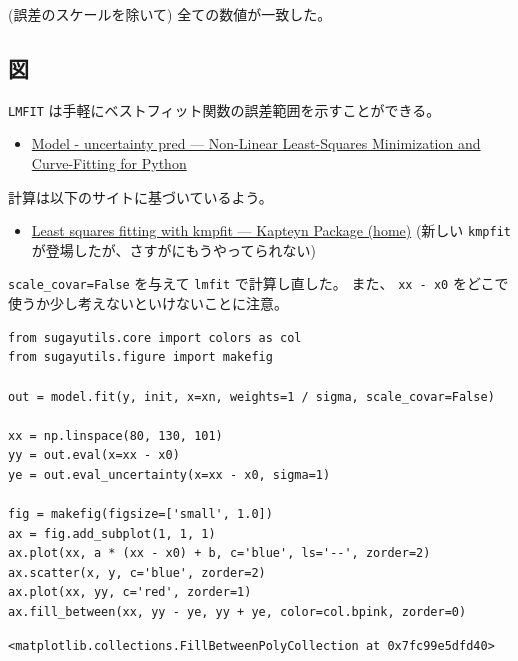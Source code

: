 \documentclass[a4paper, 8pt, notitlepage, uplatex, dvipdfmx]{jsarticle}
\begin{document}
(誤差のスケールを除いて) 全ての数値が一致した。
\subsection{図}
\label{sec:org5e487a8}
\texttt{LMFIT} は手軽にベストフィット関数の誤差範囲を示すことができる。
\begin{itemize}
\item \href{https://lmfit.github.io/lmfit-py/examples/documentation/model\_uncertainty\_pred.html\#sphx-glr-examples-documentation-model-uncertainty-pred-py}{Model - uncertainty pred — Non-Linear Least-Squares Minimization and Curve-Fitting for Python}
\end{itemize}
計算は以下のサイトに基づいているよう。
\begin{itemize}
\item \href{https://www.astro.rug.nl/software/kapteyn/kmpfittutorial.html\#confidence-and-prediction-intervals}{Least squares fitting with kmpfit — Kapteyn Package (home)}
(新しい \texttt{kmpfit} が登場したが、さすがにもうやってられない)
\end{itemize}

\texttt{scale\_covar=False} を与えて \texttt{lmfit} で計算し直した。
また、 \texttt{xx - x0} をどこで使うか少し考えないといけないことに注意。

\begin{verbatim}
from sugayutils.core import colors as col
from sugayutils.figure import makefig

out = model.fit(y, init, x=xn, weights=1 / sigma, scale_covar=False)

xx = np.linspace(80, 130, 101)
yy = out.eval(x=xx - x0)
ye = out.eval_uncertainty(x=xx - x0, sigma=1)

fig = makefig(figsize=['small', 1.0])
ax = fig.add_subplot(1, 1, 1)
ax.plot(xx, a * (xx - x0) + b, c='blue', ls='--', zorder=2)
ax.scatter(x, y, c='blue', zorder=2)
ax.plot(xx, yy, c='red', zorder=1)
ax.fill_between(xx, yy - ye, yy + ye, color=col.bpink, zorder=0)
\end{verbatim}

\label{}
\begin{verbatim}
<matplotlib.collections.FillBetweenPolyCollection at 0x7fc99e5dfd40>
\end{verbatim}
\end{document}
